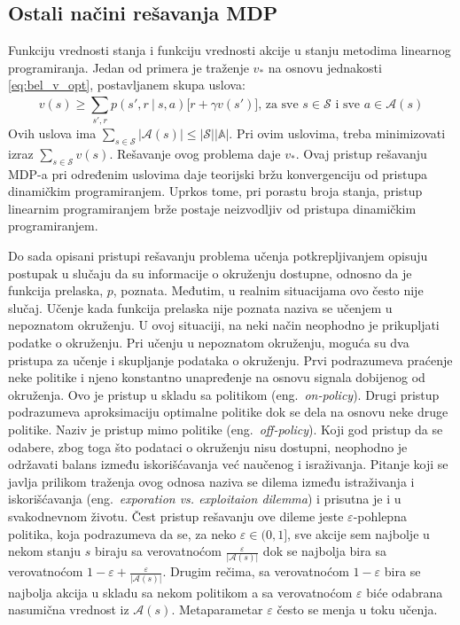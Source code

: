 \subsection{Ostali načini rešavanja MDP}

Funkciju vrednosti stanja i funkciju vrednosti akcije u stanju metodima linearnog programiranja. Jedan od primera je traženje $v_*$ na osnovu jednakosti \eqref{eq:bel_v_opt}, postavljanem skupa uslova:
\begin{equation}
	v(s) \geq \sum_{s', r}^{} p(s', r~|~s,a)\big[r+\gamma v(s')\big] \text{,~za~sve~} s \in \mathcal{S} \text{~i~sve~} a \in \mathcal{A}(s)
\end{equation}
Ovih uslova ima $\sum_{s \in \mathcal{S}}^{} |\mathcal{A}(s)| \leq |\mathcal{S}||\mathbb{A}|$. Pri ovim uslovima, treba minimizovati izraz $\sum_{s \in \mathcal{S}}^{} v(s)$. Rešavanje ovog problema daje $v_*$. Ovaj pristup rešavanju MDP-a pri određenim uslovima daje teorijski bržu konvergenciju od pristupa dinamičkim programiranjem. Uprkos tome, pri porastu broja stanja, pristup linearnim programiranjem brže postaje neizvodljiv od pristupa dinamičkim programiranjem.
\par 
Do sada opisani pristupi rešavanju problema učenja potkrepljivanjem opisuju postupak u slučaju da su informacije o okruženju dostupne, odnosno da je funkcija prelaska, $p$, poznata. Međutim, u realnim situacijama ovo često nije slučaj. Učenje kada funkcija prelaska nije poznata naziva se učenjem u nepoznatom okruženju. U ovoj situaciji, na neki način neophodno je prikupljati podatke o okruženju. Pri učenju u nepoznatom okruženju, moguća su dva pristupa za učenje i skupljanje podataka o okruženju. Prvi podrazumeva praćenje neke politike i njeno konstantno unapređenje na osnovu signala dobijenog od okruženja. Ovo je pristup u skladu sa politikom (eng.~{\em on-policy}). Drugi pristup podrazumeva aproksimaciju optimalne politike dok se dela na osnovu neke druge politike. Naziv je pristup mimo politike (eng.~{\em off-policy}). Koji god pristup da se odabere, zbog toga što podataci o okruženju nisu dostupni, neophodno je održavati balans između iskorišćavanja već naučenog i israživanja. Pitanje koji se javlja prilikom traženja ovog odnosa naziva se dilema između istraživanja i iskorišćavanja (eng.~{\em exporation vs. exploitaion dilemma}) i prisutna je i u svakodnevnom životu. Čest pristup rešavanju ove dileme jeste $\varepsilon$-pohlepna politika, koja podrazumeva da se, za neko $\varepsilon \in (0,1]$, sve akcije sem najbolje u nekom stanju $s$ biraju sa verovatnoćom $\frac{\varepsilon}{|\mathcal{A}(s)|}$ dok se najbolja bira sa verovatnoćom $1- \varepsilon + \frac{\varepsilon}{|\mathcal{A}(s)|}$. Drugim rečima, sa verovatnoćom $1-\varepsilon$ bira se najbolja akcija u skladu sa nekom politikom a sa verovatnoćom $\varepsilon$ biće odabrana nasumična vrednost iz $\mathcal{A}(s)$. Metaparametar $\varepsilon$ često se menja u toku učenja.
